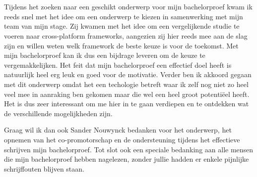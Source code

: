 
\chapter*{}
\label{ch:voorwoord}


Tijdens het zoeken naar een geschikt onderwerp voor mijn bachelorproef kwam ik reeds snel met het idee om een onderwerp te kiezen in samenwerking met mijn team van mijn stage. Zij kwamen met het idee om een vergelijkende studie te voeren naar cross-platform frameworks, aangezien zij hier reeds mee aan de slag zijn en willen weten welk framework de beste keuze is voor de toekomst. Met mijn bachelorproef kan ik dus een bijdrage leveren om de keuze te vergemakkelijken. Het feit dat mijn bachelorproef een effectief doel heeft is natuurlijk heel erg leuk en goed voor de motivatie. Verder ben ik akkoord gegaan met dit onderwerp omdat het een techologie betreft waar ik zelf nog niet zo heel veel mee in aanraking ben gekomen maar die wel een heel groot potentiëel heeft. Het is dus zeer interessant om me hier in te gaan verdiepen en te ontdekken wat de verschillende mogelijkheden zijn.

Graag wil ik dan ook Sander Nouwynck bedanken voor het onderwerp, het opnemen van het co-promotorschap en de ondersteuning tijdens het effectieve schrijven mijn bachelorproef. Tot slot ook een speciale bedanking aan alle mensen die mijn bachelorproef hebben nagelezen, zonder jullie hadden er enkele pijnlijke schrijffouten blijven staan.